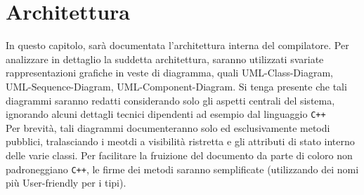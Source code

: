 \section{Architettura}
In questo capitolo, sarà documentata l'architettura interna del compilatore. Per 
analizzare in dettaglio la suddetta architettura, saranno utilizzati svariate rappresentazioni grafiche 
in veste di diagramma, quali UML-Class-Diagram, UML-Sequence-Diagram, UML-Component-Diagram. Si tenga presente che tali
diagrammi saranno redatti considerando solo gli aspetti centrali del sistema, ignorando alcuni dettagli tecnici
dipendenti ad esempio dal linguaggio \texttt{C++} \\

Per brevità, tali diagrammi documenteranno solo ed esclusivamente metodi pubblici, tralasciando i meotdi
a visibilità ristretta e gli attributi di stato interno delle varie classi. Per facilitare la fruizione del documento
da parte di coloro non padroneggiano \texttt{C++}, le firme dei metodi saranno semplificate (utilizzando dei nomi più 
User-friendly per i tipi).\\